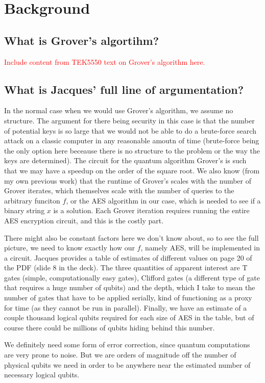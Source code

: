 \chapter{Background}
\section{What is Grover's algortihm?}
\textcolor{red}{Include content from TEK5550 text on Grover's algorithm here.}

\section{What is Jacques' full line of argumentation?}
In the normal case when we would use Grover's algorithm, we assume no structure. The argument for there being security in this case is that the number of potential keys is so large that we would not be able to do a brute-force search attack on a classic computer in any reasonable amoutn of time (brute-force being the only option here beceause there is no structure to the problem or the way the keys are determined). The circuit for the quantum algorithm Grover's is such that we may have a speedup on the order of the square root. We also know (from my own previous work) that the runtime of Grover's scales with the number of Grover iterates, which themselves scale with the number of queries to the arbitrary funciton $f$, or the AES algorithm in our case, which is needed to see if a binary string $x$ is a solution. Each Grover iteration requires running the entire AES encryption circuit, and this is the costly part.

There might also be constant factors here we don't know about, so to see the full picture, we need to know exactly how our $f$, namely AES, will be implemented in a circuit. Jacques provides a table of estimates of different values on page 20 of the PDF (slide 8 in the deck). The three quantities of apparent interest are T gates (simple, computationally easy gates), Clifford gates (a different type of gate that requires a huge number of qubits) and the depth, which I take to mean the number of gates that have to be applied serially, kind of functioning as a proxy for time (as they cannot be run in parallel). Finally, we have an estimate of a couple thousand logical qubits required for each size of AES in the table, but of course there could be millions of qubits hiding behind this number.

We definitely need some form of error correction, since quantum computations are very prone to noise. But we are orders of magnitude off the number of physical qubits we need in order to be anywhere near the estimated number of necessary logical qubits.

